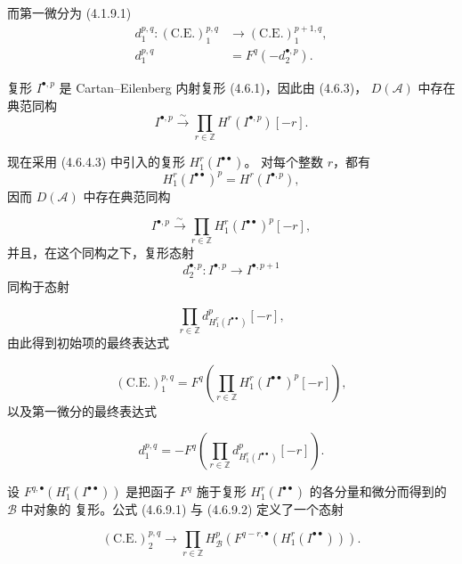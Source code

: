 \clearpage
{}%
\begingroup\small\setlength{\parskip}{0pt}\setlength{\emergencystretch}{1.5em}
\setlength{\abovedisplayskip}{4pt plus 2pt minus 2pt}%
\setlength{\belowdisplayskip}{4pt plus 2pt minus 2pt}%

\noindent 而第一微分为 (4.1.9.1)
\[
\begin{aligned}
d_1^{p,q}\colon(\mathrm{C.E.})_1^{p,q}
  &\longrightarrow(\mathrm{C.E.})_1^{p+1,q},\\
d_1^{p,q}&=F^q(-d_2^{\bullet,p}).
\end{aligned}
\]

复形 $I^{\bullet,p}$ 是 Cartan--Eilenberg 内射复形 (4.6.1)，因此由 (4.6.3)，
$D(\mathcal A)$ 中存在典范同构
\[
I^{\bullet,p}\xrightarrow{\sim}
\prod_{r\in\mathbb Z}H^r(I^{\bullet,p})[-r].
\]

现在采用 (4.6.4.3) 中引入的复形 $H_1^r(I^{\bullet\bullet})$。
对每个整数 $r$，都有
\[
H_1^r(I^{\bullet\bullet})^p=H^r(I^{\bullet,p}),
\]
因而 $D(\mathcal A)$ 中存在典范同构

\[
I^{\bullet,p}\xrightarrow{\sim}
\prod_{r\in\mathbb Z}H_1^r(I^{\bullet\bullet})^p[-r],
\]
并且，在这个同构之下，复形态射
\[
d_2^{\bullet,p}\colon
I^{\bullet,p}\longrightarrow I^{\bullet,p+1}
\]
同构于态射

\[
\prod_{r\in\mathbb Z}
d_{H_1^r(I^{\bullet\bullet})}^{p}[-r],
\]
由此得到初始项的最终表达式

\[
(\mathrm{C.E.})_1^{p,q}
=F^q\left(
\prod_{r\in\mathbb Z}H_1^r(I^{\bullet\bullet})^p[-r]
\right),
\tag{4.6.9.1}
\]
以及第一微分的最终表达式

\[
d_1^{p,q}
=-F^q\left(
\prod_{r\in\mathbb Z}d_{H_1^r(I^{\bullet\bullet})}^{p}[-r]
\right).
\tag{4.6.9.2}
\]

设 $F^{q,\bullet}(H_1^r(I^{\bullet\bullet}))$ 是把函子 $F^q$ 施于复形
$H_1^r(I^{\bullet\bullet})$ 的各分量和微分而得到的 $\mathcal B$ 中对象的
复形。公式 (4.6.9.1) 与 (4.6.9.2) 定义了一个态射

\[
(\mathrm{C.E.})_2^{p,q}\longrightarrow
\prod_{r\in\mathbb Z}
H_{\mathcal B}^{p}\left(
F^{q-r,\bullet}(H_1^r(I^{\bullet\bullet}))
\right).
\tag{4.6.9.3}
\]
\endgroup
